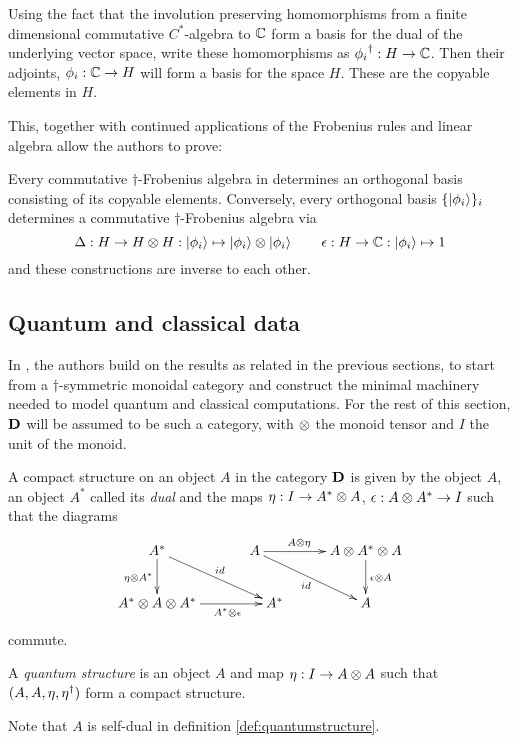Using the fact that the involution preserving homomorphisms from a finite dimensional commutative
$C^{*}$-algebra to $\mathbb{C}$ form a basis for the dual of the underlying vector space, write these
homomorphisms as ${\phi_{i}}^{\dagger}:H \to \mathbb{C}$. Then their adjoints, $\phi_{i}:\mathbb{C}\to H$ will form a
basis for the space $H$. These are the copyable elements in $H$.

This, together with continued applications of the Frobenius rules and linear algebra allow the
authors to prove:
\begin{theorem}
  Every commutative $\dagger$-Frobenius algebra in \fdh determines an orthogonal basis consisting
  of its copyable elements. Conversely, every orthogonal basis $\{\left\vert{\phi_{i}}\right\rangle\}_{i}$ determines
  a commutative $\dagger$-Frobenius algebra via \[\Delta:H\to H\otimes H: \left\vert{\phi_{i}}\right\rangle\mapsto
  \left\vert{\phi_{i}}\right\rangle \otimes \left\vert{\phi_{i}}\right\rangle\qquad\epsilon : H\to \mathbb{C} : \left\vert{\phi_{i}}\right\rangle \mapsto 1\] and these
  constructions are inverse to each other.
\end{theorem}

\subsection{Quantum and classical data}\label{sec:quantumclassical}
In \cite{coecke08structures}, the authors build on the results as related in the previous sections,
to start from a $\dagger$-symmetric monoidal category and construct the minimal machinery needed to
model quantum and classical computations. For the rest of this section, $\mathbf{D}$ will be assumed to be
such a category, with $\otimes$ the monoid tensor and $I$ the unit of the monoid.

\begin{definition}
  A compact structure on an object $A$ in the category $\mathbf{D}$ is given by the object $A$, an object
  $A^{*}$ called its \emph{dual} and the maps $\eta:I \to A^{*}\otimes A$, $\epsilon: A\otimes A^{*} \to I$
  such that the diagrams
  \[
    \xymatrix@C+20pt{
      A^{*} \ar[dr]^{id} \ar[d]_{\eta\*A^{*}} \\
      A^{*} \*A\*A^{*}  \ar[r]_(.6){A^{*} \*\epsilon} & A^{*}
    }\hskip-3em
    \xymatrix@C+20pt{
      A \ar[r]^(.4){A\*\eta} \ar[dr]_{id} & A\* A^{*}\* A \ar[d]^{\epsilon\*A}\\
      & A
    }
  \]
  commute.
\end{definition}

\begin{definition}\label{def:quantumstructure}
  A \emph{quantum structure} is an object $A$ and map $\eta:I\to A\otimes A$ such that
  $(A,A,\eta,{\eta}^{\dagger})$ form a compact structure.
\end{definition}
Note that $A$ is self-dual in definition \ref{def:quantumstructure}.


